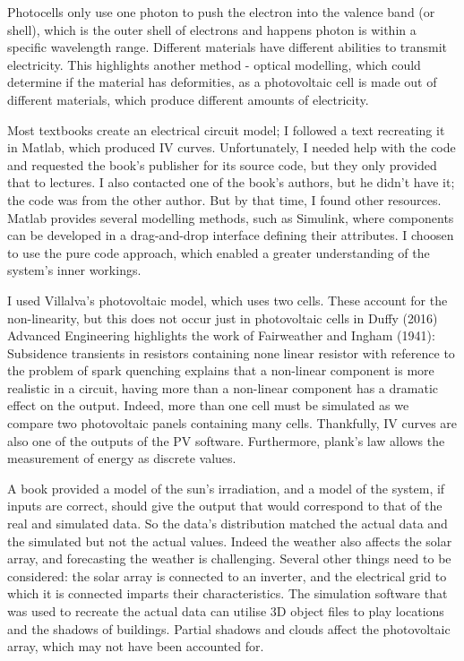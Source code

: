 \documentclass{article}
\begin{document}
Photocells only use one photon to push the electron into the valence band (or shell), which is the outer shell of electrons and happens photon is within a specific wavelength range. Different materials have different abilities to transmit electricity. This highlights another method - optical modelling, which could determine if the material has deformities, as a photovoltaic cell is made out of different materials, which produce different amounts of electricity. 

Most textbooks create an electrical circuit model; I followed a text recreating it in Matlab, which produced IV curves. Unfortunately, I needed help with the code and requested the book's publisher for its source code, but they only provided that to lectures. I also contacted one of the book's authors, but he didn't have it; the code was from the other author. But by that time, I found other resources. Matlab provides several modelling methods, such as Simulink, where components can be developed in a drag-and-drop interface defining their attributes. I choosen to use the pure code approach, which enabled a greater understanding of the system's inner workings. 

I used Villalva's photovoltaic model, which uses two cells. These account for the non-linearity, but this does not occur just in photovoltaic cells in Duffy (2016) Advanced Engineering highlights the work of Fairweather and Ingham (1941): Subsidence transients in resistors containing none linear resistor with reference to the problem of spark quenching explains that a non-linear component is more realistic in a circuit, having more than a non-linear component has a dramatic effect on the output. Indeed, more than one cell must be simulated as we compare two photovoltaic panels containing many cells. Thankfully, IV curves are also one of the outputs of the PV software. Furthermore, plank's law allows the measurement of energy as discrete values. 

A book provided a model of the sun's irradiation, and a model of the system, if inputs are correct, should give the output that would correspond to that of the real and simulated data. So the data's distribution matched the actual data and the simulated but not the actual values. Indeed the weather also affects the solar array, and forecasting the weather is challenging. Several other things need to be considered: the solar array is connected to an inverter, and the electrical grid to which it is connected imparts their characteristics. The simulation software that was used to recreate the actual data can utilise 3D object files to play locations and the shadows of buildings. Partial shadows and clouds affect the photovoltaic array, which may not have been accounted for. 
\end{document}
